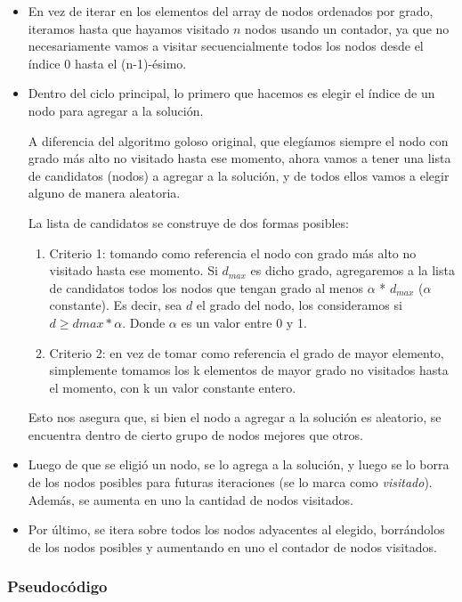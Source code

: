 \begin{itemize}
    \item En vez de iterar en los elementos del array de nodos ordenados por grado, iteramos hasta que hayamos visitado $n$ nodos usando un contador, ya que no necesariamente vamos a visitar secuencialmente todos los nodos desde el índice 0 hasta el (n-1)-ésimo.
    \item Dentro del ciclo principal, lo primero que hacemos es elegir el índice de un nodo para agregar a la solución.

    A diferencia del algoritmo goloso original, que elegíamos siempre el nodo con grado más alto no visitado hasta ese momento, ahora vamos a tener una lista de candidatos (nodos) a agregar a la solución, y de todos ellos vamos a elegir alguno de manera aleatoria.

    La lista de candidatos se construye de dos formas posibles:
    \begin{enumerate}
        \item Criterio 1: tomando como referencia el nodo con grado más alto no visitado hasta ese momento. Si $d_{max}$ es dicho grado, agregaremos a la lista de candidatos todos los nodos que tengan grado al menos $\alpha$ * $d_{max}$ ($\alpha$ constante). Es decir, sea $d$ el grado del nodo, los consideramos si $d \geq d{max} * \alpha$. Donde $\alpha$ es un valor entre 0 y 1.
        \item Criterio 2: en vez de tomar como referencia el grado de mayor elemento, simplemente tomamos los k elementos de mayor grado no visitados hasta el momento, con k un valor constante entero.
    \end{enumerate}

    Esto nos asegura que, si bien el nodo a agregar a la solución es aleatorio, se encuentra dentro de cierto grupo de nodos mejores que otros.

    \item Luego de que se eligió un nodo, se lo agrega a la solución, y luego se lo borra de los nodos posibles para futuras iteraciones (se lo marca como \textit{visitado}). Además, se aumenta en uno la cantidad de nodos visitados.
    \item Por último, se itera sobre todos los nodos adyacentes al elegido, borrándolos de los nodos posibles y aumentando en uno el contador de nodos visitados.
\end{itemize}

\subsubsection{Pseudocódigo}

